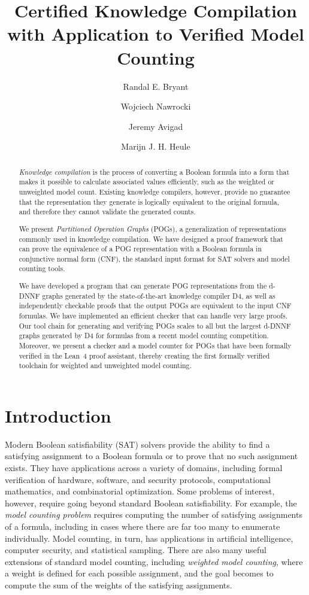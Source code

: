 \documentclass[letterpaper,USenglish,cleveref, autoref, thm-restate]{lipics-v2021}
\title{Certified Knowledge Compilation \\ with Application to Verified Model Counting}
\author{Randal E. Bryant}{Computer Science Department, Carnegie Mellon University, Pittsburgh, PA 15213 USA}{rebryant@cmu.edu}{https://orcid.org/0000-0001-5024-6613}{Supported by NSF grant CCF-2108521}
\author{Wojciech Nawrocki}{Department of Philosophy, Carnegie Mellon University}{wjnawrock@cmu.edu}{https://orcid.org/0000-0002-8839-0618}{}
\author{Jeremy Avigad}{Department of Philosophy, Carnegie Mellon University}{avigad@cmu.edu}{https://orcid.org/0000-0003-1275-315X}{}
\author{Marijn J. H. Heule}{Computer Science Department, Carnegie Mellon University}{marijn@cmu.edu}{https://orcid.org/0000-0002-5587-8801}{Supported by NSF grant CCF-2108521}
\newcommand{\progname}[1]{\textsc{#1}}
\newcommand{\dfour}{\progname{D4}}
\newcommand{\lean}{Lean~4}
\begin{document}
\maketitle

\begin{abstract}

\emph{Knowledge compilation} is the process of converting a Boolean
formula into a form that makes it possible to calculate associated
values efficiently, such as the weighted or unweighted model
count. Existing knowledge compilers, however,
provide no guarantee that the representation they generate
is logically equivalent to the original formula, and therefore they cannot validate the generated counts.

We present \emph{Partitioned Operation Graphs} (POGs), a generalization
of representations commonly used in knowledge compilation.
We have designed a proof framework that can prove the equivalence of a
POG representation with a Boolean formula in conjunctive normal form (CNF),
the standard input format for SAT solvers and model counting tools.

We have developed a program that can generate POG representations from
the d-DNNF graphs generated by the state-of-the-art knowledge compiler
\dfour, as well as independently checkable proofs that the output POGs
are equivalent to the input CNF formulas.  We have implemented an
efficient checker that can handle very large proofs. Our tool chain
for generating and verifying POGs scales to all but the largest d-DNNF
graphs generated by \dfour{} for formulas from a recent model counting
competition. Moreover, we present a checker and a model counter for POGs that have
been formally verified in the \lean{} proof assistant, thereby
creating the first formally verified toolchain for
weighted and unweighted
model counting.
\end{abstract}

\section{Introduction}

Modern Boolean satisfiability (SAT) solvers provide the ability to
find a satisfying assignment to a Boolean formula or to prove that no
such assignment exists.  They have applications across a variety of
domains, including formal verification of hardware, software, and
security protocols, computational mathematics, and combinatorial
optimization.  Some problems of interest, however, require going
beyond standard Boolean satisfiability.  For example, the {\em model
  counting problem} requires computing the number of satisfying
assignments of a formula, including in cases where there are far too many
to enumerate individually.  Model counting, in turn, has
applications in artificial intelligence, computer security, and
statistical sampling.  There are also many useful extensions of standard model counting,
including {\em
  weighted model counting}, where a weight is defined for
each possible assignment, and the goal becomes to compute the sum of the weights
of the satisfying assignments.
\end{document}
